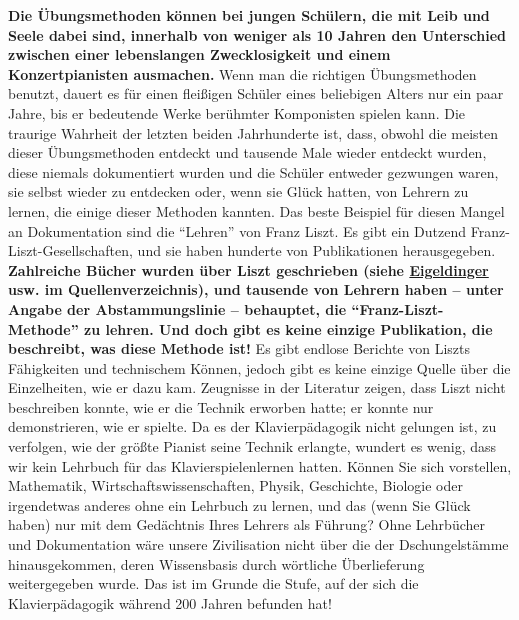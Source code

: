 \textbf{Die Übungsmethoden können bei jungen Schülern, die mit Leib und Seele dabei sind, innerhalb von weniger als 10 Jahren den Unterschied zwischen einer lebenslangen Zwecklosigkeit und einem Konzertpianisten ausmachen.}
Wenn man die richtigen Übungsmethoden benutzt, dauert es für einen fleißigen Schüler eines beliebigen Alters nur ein paar Jahre, bis er bedeutende Werke berühmter Komponisten spielen kann.
Die traurige Wahrheit der letzten beiden Jahrhunderte ist, dass, obwohl die meisten dieser Übungsmethoden entdeckt und tausende Male wieder entdeckt wurden, diese niemals dokumentiert wurden und die Schüler entweder gezwungen waren, sie selbst wieder zu entdecken oder, wenn sie Glück hatten, von Lehrern zu lernen, die einige dieser Methoden kannten.
Das beste Beispiel für diesen Mangel an Dokumentation sind die \enquote{Lehren} von Franz Liszt.
Es gibt ein Dutzend Franz-Liszt-Gesellschaften, und sie haben hunderte von Publikationen herausgegeben.
\textbf{Zahlreiche Bücher wurden über Liszt geschrieben (siehe \hyperref[Eigeldinger]{Eigeldinger} usw. im Quellenverzeichnis), und tausende von Lehrern haben -- unter Angabe der Abstammungslinie -- behauptet, die \enquote{Franz-Liszt-Methode} zu lehren.
Und doch gibt es keine einzige Publikation, die beschreibt, was diese Methode ist!}
Es gibt endlose Berichte von Liszts Fähigkeiten und technischem Können, jedoch gibt es keine einzige Quelle über die Einzelheiten, wie er dazu kam.
Zeugnisse in der Literatur zeigen, dass Liszt nicht beschreiben konnte, wie er die Technik erworben hatte; er konnte nur demonstrieren, wie er spielte.
Da es der Klavierpädagogik nicht gelungen ist, zu verfolgen, wie der größte Pianist seine Technik erlangte, wundert es wenig, dass wir kein Lehrbuch für das Klavierspielenlernen hatten.
Können Sie sich vorstellen, Mathematik, Wirtschaftswissenschaften, Physik, Geschichte, Biologie oder irgendetwas anderes ohne ein Lehrbuch zu lernen, und das (wenn Sie Glück haben) nur mit dem Gedächtnis Ihres Lehrers als Führung?
Ohne Lehrbücher und Dokumentation wäre unsere Zivilisation nicht über die der Dschungelstämme hinausgekommen, deren Wissensbasis durch wörtliche Überlieferung weitergegeben wurde.
Das ist im Grunde die Stufe, auf der sich die Klavierpädagogik während 200 Jahren befunden hat!

